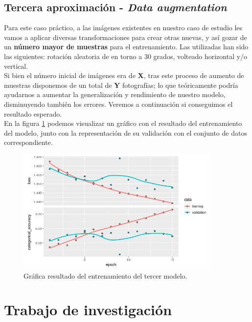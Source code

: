 \documentclass[]{article}
\begin{document}
	\subsection{Tercera aproximación - \textit{Data augmentation}}
	
		Para este caso práctico, a las imágenes existentes en nuestro caso de estudio les vamos a aplicar diversas transformaciones para crear otras nuevas, y así gozar de un \textbf{número mayor de muestras} para el entrenamiento. Las utilizadas han sido las siguientes: rotación aleatoria de en torno a 30 grados, volteado horizontal y/o vertical.\\
		
		Si bien el número inicial de imágenes era de \textbf{X}, tras este proceso de aumento de muestras disponemos de un total de \textbf{Y} fotografías; lo que teóricamente podría ayudarnos a aumentar la generalización y rendimiento de nuestro modelo, disminuyendo también los errores. Veremos a continuación si conseguimos el resultado esperado.\\
				
		En la figura \ref{third-nn} podemos visualizar un gráfico con el resultado del entrenamiento del modelo, junto con la representación de su validación con el conjunto de datos correspondiente.\\
	
		\begin{figure}[h]
			\centering
			\includegraphics[width=0.9\textwidth]{./img/model3}
			\caption{Gráfica resultado del entrenamiento del tercer modelo.}
			\label{third-nn}
		\end{figure}
	
\section{Trabajo de investigación}
\end{document}
